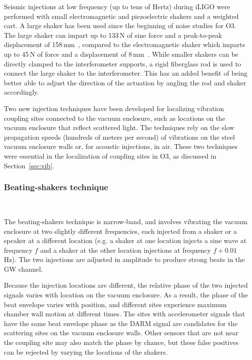 Seismic injections at low frequency (up to tens of Hertz) during \ac{iLIGO} were performed with small electromagnetic and piezoelectric shakers and a weighted cart.
A large shaker has been used since the beginning of noise studies for \ac{O3}.
The large shaker can impart up to 133\,N of sine force and a peak-to-peak displacement of 158\,mm~\citep{big_shaker}, compared to the electromagnetic shaker which imparts up to 45\,N of force and a displacement of 8\,mm~\citep{bk}.
While smaller shakers can be directly clamped to the interferometer supports, a rigid fiberglass rod is used to connect the large shaker to the interferometer.
This has an added benefit of being better able to adjust the direction of the actuation by angling the rod and shaker accordingly.

Two new injection techniques have been developed for localizing vibration coupling sites connected to the vacuum enclosure, such as locations on the vacuum enclosure that reflect scattered light.
The techniques rely on the slow propagation speeds (hundreds of meters per second) of vibrations on the steel vacuum enclosure walls or, for acoustic injections, in air.
These two techniques were essential in the localization of coupling sites in \ac{O3}, as discussed in Section~\ref{sec:vib}.

\subsubsection{Beating-shakers technique}~\label{sec:injections-vib-beats}

The beating-shakers technique is narrow-band, and involves vibrating the vacuum enclosure at two slightly different frequencies, each injected from a shaker or a speaker at a different location (e.g. a shaker at one location injects a sine wave at frequency $f$ and a shaker at the other location injections at frequency $f + 0.01$\,Hz).
The two injections are adjusted in amplitude to produce strong beats in the \ac{GW} channel.

Because the injection locations are different, the relative phase of the two injected signals varies with location on the vacuum enclosure.
As a result, the phase of the beat envelope varies with position, and different sites experience maximum chamber wall motion at different times.
The sites with accelerometer signals that have the same beat envelope phase as the \ac{DARM} signal are candidates for the scattering sites on the vacuum enclosure walls.
Other sensors that are not near the coupling site may also match the phase by chance, but these false positives can be rejected by varying the locations of the shakers.

